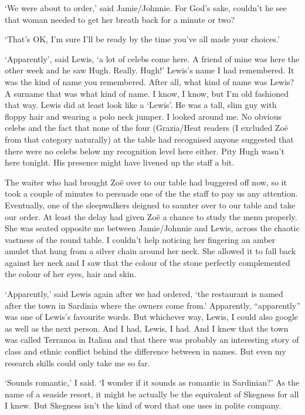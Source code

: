 `We were about to order,' said Jamie/Johnnie. For God's sake,
couldn't he see that woman needed to get her breath back for a
minute or two?

`That's OK, I'm sure I'll be ready by the time you've all made your
choices.'

`Apparently', said Lewis, `a lot of celebs come here. A friend of mine was here the other week and he saw
Hugh. Really. Hugh!' Lewis's name I had remembered. It was the kind
of name you remembered. After all, what kind of name was Lewis? A
surname that was what kind of name. I know, I know, but I'm old
fashioned that way. Lewis did at least look like a `Lewis'. He was a
tall, slim guy with floppy hair and wearing a polo neck jumper. I
looked around me. No obvious celebs and the fact that none of the
four ({\twelvesl Grazia}/{\twelvesl Heat\/} readers (I excluded
Zo{\"e} from that category naturally) at the table had recognised
anyone suggested that there were no celebs below my recognition
level here either. Pity Hugh wasn't here tonight. His presence might
have livened up the staff a bit.

The waiter who had brought Zo{\"e} over to our table had buggered
off now, so it took a couple of minutes to persuade one of the the
staff to pay us any attention. Eventually, one of the sleepwalkers deigned to saunter over to our
table and take our order. At least the delay had given Zo{\"e} a
chance to study the menu properly. She was seated opposite me between Jamie/Johnnie and Lewis, across the chaotic vastness of the round table. I couldn't help noticing her fingering an
amber amulet that hung from a silver chain around her neck. She
allowed it to fall back against her neck and I saw
that the colour of the stone perfectly complemented the colour of her eyes, hair and
skin.

`Apparently,' said Lewis again after we had ordered, `the restaurant
is named after the town in Sardinia where the owners come from.'
Apparently, ``apparently'' was one of Lewis's favourite words. But
whichever way, Lewis, I could also google as well as the next
person. And I had, Lewis, I had. And I knew that the town was called
Terranoa in Italian and that there was probably an interesting story of class and ethnic conflict behind the difference between in names. But even my research skills
could only take me so far.

`Sounds romantic,' I said. `I wonder if it sounds as romantic in
Sardinian?' As the name of a seaside resort, it might be actually be the equivalent of Skegness for
all I knew. But Skegness isn't the kind of word that one uses in
polite company.

